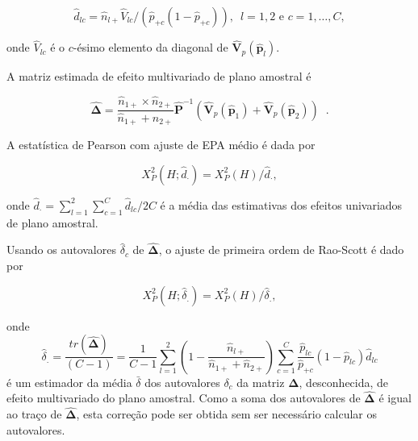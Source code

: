 \documentclass[]{book}
\numberwithin{example}{chapter}
\numberwithin{remark}{chapter}
\numberwithin{definition}{chapter}
\begin{document}
\begin{equation}
\hat{d}_{lc}=\widehat{n}_{l+}\hat{V}_{lc}/\left( \hat{p}_{+c}\left( 1-\hat{p}
_{+c}\right) \right) ,\ \;l=1,2\mbox{ e }c=1,\ldots ,C,  \label{eq:Tab5}
\end{equation}

onde \(\hat{V}_{lc}\) é o \(c\)-ésimo elemento da diagonal de
\(\mathbf{ \hat{V}}_{p}\left( \widehat{\mathbf{p}}_{l}\right)\).

A matriz estimada de efeito multivariado de plano amostral é

\begin{equation}
\mathbf{\hat{\Delta}=}\frac{\widehat{n}_{1+}\times \widehat{n}_{2+}}{
\widehat{n}_{1+}+\widehat{n}_{2+}}\mathbf{\hat{P}}^{-1}\left( \mathbf{\hat{V}
}_{p}\left( \widehat{\mathbf{p}}_{1}\right) +\mathbf{\hat{V}}_{p}\left( 
\widehat{\mathbf{p}}_{2}\right) \right) \;\;.  \label{eq:Tab6}
\end{equation}

A estatística de Pearson com ajuste de EPA médio é dada por

\begin{equation}
X_{P}^{2}\left( H;\hat{d}_{\cdot }\right) =X_{P}^{2}\left( H\right) /\hat{d}
_{\cdot },  \label{eq:Tab7}
\end{equation}

onde
\(\hat{d}_{\cdot }=\sum\limits_{l=1}^{2}\sum\limits_{c=1}^{C}\hat{d} _{lc}/2C\)
é a média das estimativas dos efeitos univariados de plano amostral.

Usando os autovalores \(\hat{\delta}_{c}\) de \(\mathbf{\hat{\Delta}}\),
o ajuste de primeira ordem de Rao-Scott é dado por

\begin{equation}
X_{P}^{2}\left( H;\hat{\delta}_{.}\right) =X_{P}^{2}\left( H\right) /\hat{
\delta}_{.},  \label{eq:Tab8}
\end{equation}

onde \[
\hat{\delta}_{.}=\frac{tr\left( \mathbf{\hat{\Delta}}\right) }{\left(
C-1\right) }=\frac{1}{C-1}\sum\limits_{l=1}^{2}\left( 1-\frac{\widehat{n}
_{l+}}{\widehat{n}_{1+}+\widehat{n}_{2+}}\right) \sum\limits_{c=1}^{C}\frac{
\hat{p}_{lc}}{\hat{p}_{+c}}\left( 1-\hat{p}_{lc}\right) \hat{d}_{lc} 
\] é um estimador da média \(\bar{\delta}\) dos autovalores
\(\delta _{c}\) da matriz \(\mathbf{\Delta }\), desconhecida, de efeito
multivariado do plano amostral. Como a soma dos autovalores de
\(\mathbf{\hat{\Delta}}\) é igual ao traço de \(\mathbf{\hat{\Delta}}\),
esta correção pode ser obtida sem ser necessário calcular os
autovalores.
\end{document}
